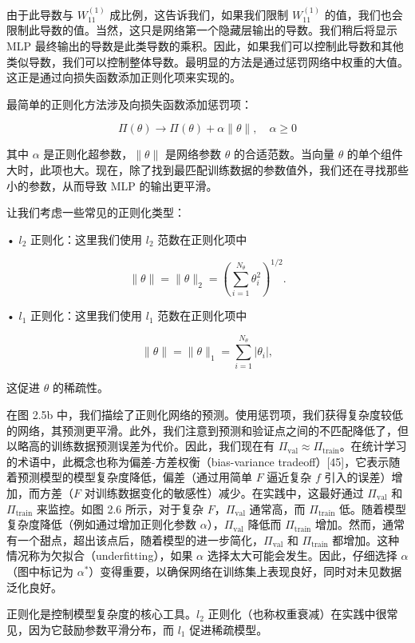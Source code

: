 由于此导数与 $W^{(1)}_{11}$ 成比例，这告诉我们，如果我们限制 $W^{(1)}_{11}$ 的值，我们也会限制此导数的值。当然，这只是网络第一个隐藏层输出的导数。我们稍后将显示 MLP 最终输出的导数是此类导数的乘积。因此，如果我们可以控制此导数和其他类似导数，我们可以控制整体导数。最明显的方法是通过惩罚网络中权重的大值。这正是通过向损失函数添加正则化项来实现的。

最简单的正则化方法涉及向损失函数添加惩罚项：

\[
\Pi(\theta) \to \Pi(\theta) + \alpha \| \theta \|, \quad \alpha \geq 0
\]

其中 $\alpha$ 是正则化超参数，$\| \theta \|$ 是网络参数 $\theta$ 的合适范数。当向量 $\theta$ 的单个组件大时，此项也大。现在，除了找到最匹配训练数据的参数值外，我们还在寻找那些小的参数，从而导致 MLP 的输出更平滑。

让我们考虑一些常见的正则化类型：

• $l_2$ 正则化：这里我们使用 $l_2$ 范数在正则化项中

\[
\| \theta \| = \| \theta \|_2 = \left( \sum_{i=1}^{N_\theta} \theta_i^2 \right)^{1/2}.
\]

• $l_1$ 正则化：这里我们使用 $l_1$ 范数在正则化项中

\[
\| \theta \| = \| \theta \|_1 = \sum_{i=1}^{N_\theta} | \theta_i |,
\]

这促进 $\theta$ 的稀疏性。

在图 2.5b 中，我们描绘了正则化网络的预测。使用惩罚项，我们获得复杂度较低的网络，其预测更平滑。此外，我们注意到预测和验证点之间的不匹配降低了，但以略高的训练数据预测误差为代价。因此，我们现在有 $\Pi_{\text{val}} \approx \Pi_{\text{train}}$。在统计学习的术语中，此概念也称为偏差-方差权衡（bias-variance tradeoff）[45]，它表示随着预测模型的模型复杂度降低，偏差（通过用简单 $F$ 逼近复杂 $f$ 引入的误差）增加，而方差（$F$ 对训练数据变化的敏感性）减少。在实践中，这最好通过 $\Pi_{\text{val}}$ 和 $\Pi_{\text{train}}$ 来监控。如图 2.6 所示，对于复杂 $F$，$\Pi_{\text{val}}$ 通常高，而 $\Pi_{\text{train}}$ 低。随着模型复杂度降低（例如通过增加正则化参数 $\alpha$），$\Pi_{\text{val}}$ 降低而 $\Pi_{\text{train}}$ 增加。然而，通常有一个甜点，超出该点后，随着模型的进一步简化，$\Pi_{\text{val}}$ 和 $\Pi_{\text{train}}$ 都增加。这种情况称为欠拟合（underfitting），如果 $\alpha$ 选择太大可能会发生。因此，仔细选择 $\alpha$（图中标记为 $\alpha^*$）变得重要，以确保网络在训练集上表现良好，同时对未见数据泛化良好。

\begin{mycomment}
正则化是控制模型复杂度的核心工具。$l_2$ 正则化（也称权重衰减）在实践中很常见，因为它鼓励参数平滑分布，而 $l_1$ 促进稀疏模型。
\end{mycomment}

